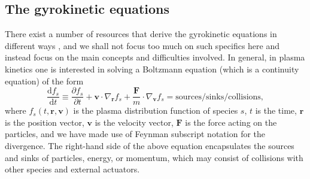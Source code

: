 \subsection{The gyrokinetic equations}
\label{subsec: Gyrokinetic equations}
There exist a number of resources that derive the gyrokinetic equations in different ways \cite{dubin1983nonlinear,hahm1988nonlinear,brizard2007foundations,parra2011phase,krommes2012gyrokinetic,burby2015hamiltonian}, and we shall not focus too much on such specifics here and instead focus on the main concepts and difficulties involved. In general, in plasma kinetics one is interested in solving a Boltzmann equation (which is a continuity equation) of the form
\begin{equation}
    \frac{\mathrm{d} f_s}{\mathrm{d} t} \equiv \frac{\partial f_s}{\partial t} + \boldsymbol{v} \cdot \nabla_{\boldsymbol{r}} f_s + \frac{\boldsymbol{F}}{m} \cdot \nabla_{\boldsymbol{v}} f_s = \mathrm{sources/sinks/collisions},
\end{equation}
where $f_s(t,\boldsymbol{r},\boldsymbol{v})$ is the plasma distribution function of species $s$, $t$ is the time, $\boldsymbol{r}$ is the position vector, $\boldsymbol{v}$ is the velocity vector, $\boldsymbol{F}$ is the force acting on the particles, and we have made use of Feynman subscript notation for the divergence. The right-hand side of the above equation encapsulates the sources and sinks of particles, energy, or momentum, which may consist of collisions with other species and external actuators. \par 


